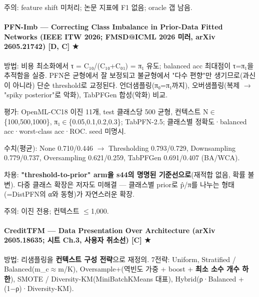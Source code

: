 \par\noindent \textbullet\enspace 주의: feature shift 미처리; 논문 지표에 F1 없음; oracle 갭 남음.


\paragraph{PFN-Imb — Correcting Class Imbalance in Prior-Data Fitted Networks (IEEE ITW 2026; FMSD@ICML 2026 미러, arXiv 2605.21742) [D, C] ★}
\par\noindent \textbullet\enspace 방법: 비용 최소화에서 τ =\allowbreak{} C₁₀/\allowbreak{}(C₁₀+\allowbreak{}C₀₁) =\allowbreak{} π₁ 유도; balanced acc 최대점이 τ=\allowbreak{}π₁을 추적함을 실증. PFN은 균형에서 잘 보정되고 불균형에서 "다수 편향"만 생기므로(과신이 아니라) 단순 threshold로 교정된다. 언더샘플링(π₀=\allowbreak{}π₁까지), 오버샘플링(복제  \ensuremath{\rightarrow}  "spiky posterior"로 악화), TabPFGen 합성(악화) 비교.


\par\noindent \textbullet\enspace 평가: OpenML-CC18 이진 11개, test 클래스당 500 균형, 컨텍스트 N\ensuremath{\in}\{100,500,1000\}, π₁\ensuremath{\in}\{0.05,0.1,0.2,0.3\}; TabPFN-2.5; 클래스별 정확도·balanced acc·worst-class acc·ROC. seed 미명시.


\par\noindent \textbullet\enspace 수치(평균): None 0.710/\allowbreak{}0.446  \ensuremath{\rightarrow}  Thresholding 0.793/\allowbreak{}0.729, Downsampling 0.779/\allowbreak{}0.737, Oversampling 0.621/\allowbreak{}0.259, TabPFGen 0.691/\allowbreak{}0.407 (BA/\allowbreak{}WCA).


\par\noindent \textbullet\enspace 차용: \textbf{"threshold-to-prior" arm을 s44의 명명된 기준선으로}(재적합 없음, 확률 불변). 다중 클래스 확장은 저자도 미해결 — 클래스별 prior로 p̂/\allowbreak{}π를 나누는 형태(=\allowbreak{}DistPFN의 α와 동형)가 자연스러운 확장.


\par\noindent \textbullet\enspace 주의: 이진 전용; 컨텍스트 \ensuremath{\leq}1,000.


\paragraph{CreditTFM — Data Presentation Over Architecture (arXiv 2605.18635; 시트 Ch.3, 사용자 취소선) [C] ★}
\par\noindent \textbullet\enspace 방법: 리샘플링을 \textbf{컨텍스트 구성 전략}으로 재정의. 7전략: Uniform, Stratified /\allowbreak{} Balanced(m\_\allowbreak{}c\ensuremath{\approx}m/\allowbreak{}K), Oversample+\allowbreak{}(역빈도 가중 +\allowbreak{} boost +\allowbreak{} \textbf{최소 소수 개수 하한}), SMOTE /\allowbreak{} Diversity-KM(MiniBatchKMeans 대표), Hybrid(ρ·Balanced +\allowbreak{} (1−ρ)·Diversity-KM).


